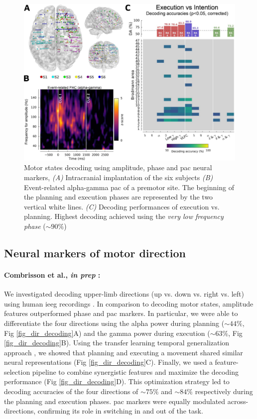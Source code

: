\documentclass[a4paper,11pt]{article}
\begin{document}
\begin{figure}[H]
\centering
    \includegraphics[width=.8\linewidth]{figures/report/combrisson_2017_NI.png}
    \caption{Motor states decoding using amplitude, phase and \ac{pac} neural markers, \textit{(A)} Intracranial implantation of the six subjects \textit{(B)} Event-related alpha-gamma \ac{pac} of a premotor site. The beginning of the planning and execution phases are represented by the two vertical white lines. \textit{(C)} Decoding performances of execution vs. planning. Highest decoding achieved using the \textit{very low frequency phase} ($\sim90\%$)}
    \label{fig_states_decoding}
\end{figure}



\begin{multicols}{2}

\subsection{Neural markers of motor direction}

\paragraph{Combrisson et al., \textit{in prep} :} We investigated decoding upper-limb directions (up vs. down vs. right vs. left) using human \ac{ieeg} recordings . In comparison to decoding motor states, amplitude features outperformed phase and \ac{pac} markers. In particular, we were able to differentiate the four directions using the alpha power during planning ($\sim44\%$, Fig \ref{fig_dir_decoding}A) and the gamma power during execution ($\sim63\%$, Fig \ref{fig_dir_decoding}B). Using the transfer learning temporal generalization approach \citep{king2014}, we showed that planning and executing a movement shared similar neural representations (Fig \ref{fig_dir_decoding}C). Finally, we used a feature-selection pipeline to combine synergistic features and maximize the decoding performance (Fig \ref{fig_dir_decoding}D). This optimization strategy led to decoding accuracies of the four directions of $\sim75\%$ and $\sim84\%$ respectively during the planning and execution phases. \Ac{pac} markers were equally modulated across-directions, confirming its role in switching in and out of the task.

\end{multicols}
\end{document}
